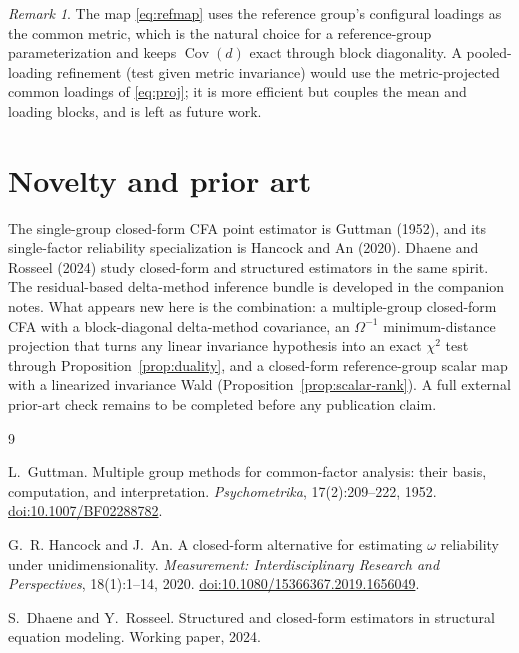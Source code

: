 \documentclass[11pt]{article}
\newcommand{\Cov}{\operatorname{Cov}}
\newcommand{\Om}{\Omega}
\theoremstyle{plain}
\theoremstyle{remark}
\newtheorem*{remark}{Remark}
\begin{document}
\begin{remark}
The map \eqref{eq:refmap} uses the reference group's configural loadings as the
common metric, which is the natural choice for a reference-group parameterization
and keeps $\Cov(d)$ exact through block diagonality. A pooled-loading refinement
(test given metric invariance) would use the metric-projected common loadings of
\eqref{eq:proj}; it is more efficient but couples the mean and loading blocks,
and is left as future work.
\end{remark}

\section{Novelty and prior art}

The single-group closed-form CFA point estimator is Guttman (1952), and its
single-factor reliability specialization is Hancock and An (2020). Dhaene and
Rosseel (2024) study closed-form and structured estimators in the same spirit.
The residual-based delta-method inference bundle is developed in the companion
notes. What appears new here is the combination: a multiple-group closed-form
CFA with a block-diagonal delta-method covariance, an $\Om^{-1}$ minimum-distance
projection that turns any linear invariance hypothesis into an exact $\chi^2$
test through Proposition~\ref{prop:duality}, and a closed-form reference-group
scalar map with a linearized invariance Wald
(Proposition~\ref{prop:scalar-rank}). A full external prior-art check remains to
be completed before any publication claim.

\begin{thebibliography}{9}

L.~Guttman.
\newblock Multiple group methods for common-factor analysis: their basis,
  computation, and interpretation.
\newblock \emph{Psychometrika}, 17(2):209--222, 1952.
\newblock \href{https://doi.org/10.1007/BF02288782}{doi:10.1007/BF02288782}.

G.~R. Hancock and J.~An.
\newblock A closed-form alternative for estimating $\omega$ reliability under
  unidimensionality.
\newblock \emph{Measurement: Interdisciplinary Research and Perspectives},
  18(1):1--14, 2020.
\newblock \href{https://doi.org/10.1080/15366367.2019.1656049}{doi:10.1080/15366367.2019.1656049}.

S.~Dhaene and Y.~Rosseel.
\newblock Structured and closed-form estimators in structural equation modeling.
\newblock Working paper, 2024.

\end{thebibliography}
\end{document}
